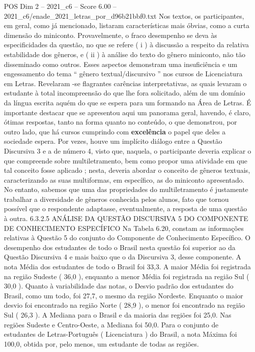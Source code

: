 \begin{textsample}{POS Dim 2 – 2021\_c6 – Score 6.00 – 2021\_c6/enade\_2021\_letras\_por\_d96b21bbf0.txt}
Nos textos, os participantes, em geral, como já mencionado, listaram características mais óbvias, como a curta dimensão do miniconto.
Provavelmente, o fraco desempenho se deva às especificidades da questão, no que se refere ( i ) à discussão a respeito da relativa estabilidade dos gêneros, e ( ii ) à análise do texto do gênero miniconto, não tão disseminado como outros.
Esses aspectos demonstram uma insuficiência e um engessamento do tema “ gênero textual/discursivo ” nos cursos de Licenciatura em Letras.
Revelaram -se flagrantes carências interpretativas, as quais levaram o estudante à total incompreensão do que lhe fora solicitado, além de um domínio da língua escrita aquém do que se espera para um formando na Área de Letras.
É importante destacar que se apresentou aqui um panorama geral, havendo, é claro, ótimas respostas, tanto na forma quanto no conteúdo, o que demonstrou, por outro lado, que há cursos cumprindo com \textbf{excelência} o papel que deles a sociedade espera.
Por vezes, houve um implícito diálogo entre a Questão Discursiva 3 e a de número 4, visto que, naquela, o participante deveria explicar o que compreende sobre multiletramento, bem como propor uma atividade em que tal conceito fosse aplicado ; nesta, deveria abordar o conceito de gêneros textuais, caracterizando as suas multiformas, em específico, as do miniconto apresentado.
No entanto, sabemos que uma das propriedades do multiletramento é justamente trabalhar a diversidade de gêneros conhecida pelos alunos, fato que tornou possível que o respondente adaptasse, eventualmente, a resposta de uma questão à outra. 6.3.2.5 ANÁLISE DA QUESTÃO DISCURSIVA 5 DO COMPONENTE DE CONHECIMENTO ESPECÍFICO Na Tabela 6.20, constam as informações relativas à Questão 5 do conjunto do Componente de Conhecimento Específico.
O desempenho dos estudantes de todo o Brasil nesta questão foi superior ao da Questão Discursiva 4 e mais baixo que o da Discursiva 3, desse componente.
A nota Média dos estudantes de todo o Brasil foi 33,3.
A maior Média foi registrada na região Sudeste ( 36,0 ), enquanto a menor Média foi registrada na região Sul ( 30,0 ).
Quanto à variabilidade das notas, o Desvio padrão dos estudantes do Brasil, como um todo, foi 27,7, o mesmo da região Nordeste.
Enquanto o maior desvio foi encontrado na região Norte ( 28,9 ), o menor foi encontrado na região Sul ( 26,3 ).
A Mediana para o Brasil e da maioria das regiões foi 25,0.
Nas regiões Sudeste e Centro-Oeste, a Mediana foi 50,0.
Para o conjunto de estudantes de Letras-Português ( Licenciatura ) do Brasil, a nota Máxima foi 100,0, obtida por, pelo menos, um estudante de todas as regiões.

\end{textsample}
